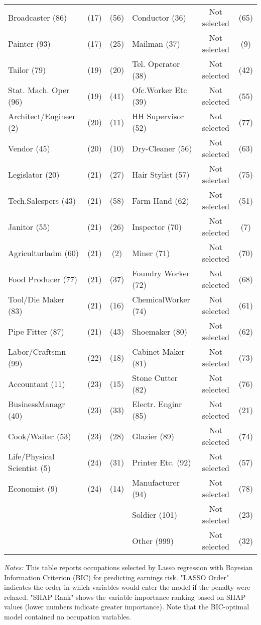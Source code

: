 \documentclass[12pt]{article}
\begin{document}
\begin{table}[H]
\begin{tabular}{lcc|lcc}
Broadcaster (86) & (17) & (56) & Conductor (36) & Not selected & (65) \\
Painter (93) & (17) & (25) & Mailman (37) & Not selected & (9) \\
Tailor (79) & (19) & (20) & Tel. Operator (38) & Not selected & (42) \\
Stat. Mach. Oper (96) & (19) & (41) & Ofc.Worker Etc (39) & Not selected & (55) \\
Architect/Engineer (2) & (20) & (11) & HH Supervisor (52) & Not selected & (77) \\
Vendor (45) & (20) & (10) & Dry-Cleaner (56) & Not selected & (63) \\
Legislator (20) & (21) & (27) & Hair Stylist (57) & Not selected & (75) \\
Tech.Salespers (43) & (21) & (58) & Farm Hand (62) & Not selected & (51) \\
Janitor (55) & (21) & (26) & Inspector (70) & Not selected & (7) \\
Agriculturladm (60) & (21) & (2) & Miner (71) & Not selected & (70) \\
Food Producer (77) & (21) & (37) & Foundry Worker (72) & Not selected & (68) \\
Tool/Die Maker (83) & (21) & (16) & ChemicalWorker (74) & Not selected & (61) \\
Pipe Fitter (87) & (21) & (43) & Shoemaker (80) & Not selected & (62) \\
Labor/Craftsmn (99) & (22) & (18) & Cabinet Maker (81) & Not selected & (73) \\
Accountant (11) & (23) & (15) & Stone Cutter (82) & Not selected & (76) \\
BusinessManagr (40) & (23) & (33) & Electr. Enginr (85) & Not selected & (21) \\
Cook/Waiter (53) & (23) & (28) & Glazier (89) & Not selected & (74) \\
Life/Physical Scientist (5) & (24) & (31) & Printer Etc. (92) & Not selected & (57) \\
Economist (9) & (24) & (14) & Manufacturer (94) & Not selected & (78) \\
& & & Soldier (101) & Not selected & (23) \\
& & & Other (999) & Not selected & (32) \\
\bottomrule
\end{tabular}%
\newline

\footnotesize
\textit{Notes:} This table reports occupations selected by Lasso regression with Bayesian Information Criterion (BIC) for predicting earnings risk. "LASSO Order" indicates the order in which variables would enter the model if the penalty were relaxed. "SHAP Rank" shows the variable importance ranking based on SHAP values (lower numbers indicate greater importance). Note that the BIC-optimal model contained no occupation variables.

\end{table}
\end{document}
